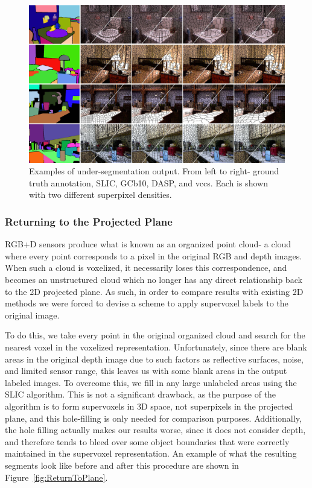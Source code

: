 \begin{figure}
\begin{center}
\includegraphics[width=1.01\linewidth]{figures/CVPR2013/Comparison_Segmentation_Small.pdf}
\end{center}
   \caption[Superpixel Comparison]{Examples of under-segmentation output. From left to right- ground truth annotation, SLIC, GCb10, DASP, and \gls{vccs}. Each is shown with two different superpixel densities.}
\label{fig:ExampleSegmentations}
\end{figure}

\subsubsection{Returning to the Projected Plane}
RGB+D sensors produce what is known as an organized point cloud- a cloud where every point corresponds to a pixel in the original RGB and depth images. When such a cloud is voxelized, it necessarily loses this correspondence, and becomes an unstructured cloud which no longer has any direct relationship back to the 2D projected plane. As such, in order to compare results with existing 2D methods we were forced to devise a scheme to apply supervoxel labels to the original image. 

To do this, we take every point in the original organized cloud and search for the nearest voxel in the voxelized representation. Unfortunately, since there are blank areas in the original depth image due to such factors as reflective surfaces, noise, and limited sensor range, this leaves us with some blank areas in the output labeled images. To overcome this, we fill in any large unlabeled areas using the SLIC algorithm. This is not a significant drawback, as the purpose of the algorithm is to form supervoxels in 3D space, not superpixels in the projected plane, and this hole-filling is only needed for comparison purposes. Additionally, the hole filling actually makes our results worse, since it does not consider depth, and therefore tends to bleed over some object boundaries that were correctly maintained in the supervoxel representation. An example of what the resulting segments look like before and after this procedure are shown in Figure~\ref{fig:ReturnToPlane}. 

